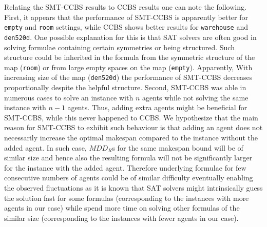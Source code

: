 \documentclass[review]{elsarticle}
\newcommand{\mddr}{\ensuremath{MDD_R}\xspace}
\newcommand{\mddrs}{\ensuremath{MDD_R}s\xspace}
\newcommand{\ccbs}{\ac{CCBS}\xspace}
\newcommand{\smtccbs}{SMT-CCBS\xspace}
\begin{document}
Relating the \smtccbs results to \ccbs results one can note the following. First, it appears that the performance of \smtccbs is apparently better for \texttt{empty} and \texttt{room} settings, while \ccbs shows better results for \texttt{warehouse} and \texttt{den520d}. One possible explanation for this is that SAT solvers are often good in solving formulae containing certain symmetries or being structured. Such structure could be inherited in the formula from the symmetric structure of the map (\texttt{room}) or from large empty spaces on the map (\texttt{empty}). Apparently, With increasing size of the map (\texttt{den520d}) the performance of \smtccbs decreases proportionally despite the helpful structure.
Second, \smtccbs was able in numerous cases to solve an instance with $n$ agents while not solving the same instance with $n-1$ agents. Thus, adding extra agents might be beneficial for \smtccbs, while this never happened to \ccbs. We hypothesize that the main reason for \smtccbs to exhibit such behaviour is that adding an agent does not necessarily increase the optimal makespan compared to the instance without the added agent. In such case, \mddrs for the same makespan bound will be of similar size and hence also the resulting formula will not be significantly larger for the instance with the added agent. Therefore underlying formulae for few consecutive numbers of agents could be of similar difficulty eventually enabling the observed fluctuations as it is known that SAT solvers  might intrinsically guess the solution fast for some formulas (corresponding to the instances with more agents in our case) while spend more time on solving other formulas of the similar size (corresponding to the instances with fewer agents in our case).



\end{document}
